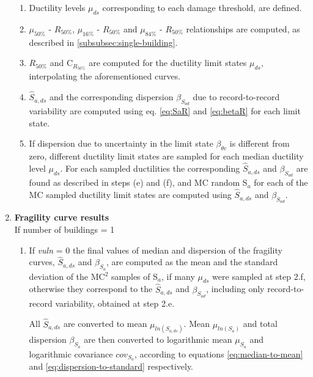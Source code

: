 \begin{enumerate}
\begin{enumerate}
\item Ductility levels $\mu_{ds}$ corresponding to each damage threshold, are defined.

\item $\mu_{50\%}$ - $R_{50\%}$, $\mu_{16\%}$ - $R_{50\%}$ and $\mu_{84\%}$ - $R_{50\%}$ relationships are computed, as described in \ref{subsubsec:single-building}.

\item $R_{50\%}$ and C$_{R_{50\%}}$ are computed for the ductility limit states $\mu_{ds}$, interpolating the aforementioned curves.

\item $\hat{S}_{a,ds}$ and the corresponding dispersion $\beta_{S_{a d}}$ due to record-to-record variability are computed using eq. \ref{eq:SaR} and \ref{eq:betaR} for each limit state.

\item If dispersion due to uncertainty in the limit state $\beta_{\theta c}$ is different from zero, different ductility limit states are sampled for each median ductility level $\mu_{ds}$. For each sampled ductilities the corresponding $\hat{S}_{a,ds}$ and $\beta_{S_{a d}}$ are found as described in steps (e) and (f), and MC random S$_a$ for each of the MC sampled ductility limit states are computed using $\hat{S}_{a,ds}$ and $\beta_{S_{a d}}$.\\

\end{enumerate}

\item \textbf{Fragility curve results}\\
If number of buildings = 1\\
\begin{enumerate}
\item If \textit{vuln} = 0
the final values of median and dispersion of the fragility curves, $\hat{S}_{a,ds}$ and $\beta_{S_a}$, are computed as the mean and the standard deviation of the MC$^2$ samples of S$_a$, if many $\mu_{ds}$ were sampled at step 2.f, otherwise they correspond to the $\hat{S}_{a,ds}$ and $\beta_{S_{a d}}$, including only record-to-record variability, obtained at step 2.e.

All $\hat{S}_{a, ds}$ are converted to mean $\mu_{ln(S_{a, ds})}$. Mean $\mu_{ln(S_{a})}$ and total dispersion $\beta_{S_a}$ are then converted to logarithmic mean $\mu_{S_a}$ and logarithmic covariance $cov_{S_a}$, according to equations \ref{eq:median-to-mean} and \ref{eq:dispersion-to-standard} respectively.


\end{enumerate}
\end{enumerate}
